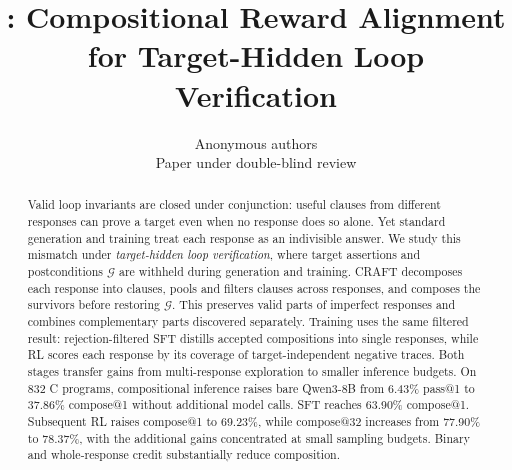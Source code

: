 \documentclass{article}
\title{\sam{}: Compositional Reward Alignment\\
for Target-Hidden Loop Verification}
\author{
  Anonymous authors\\
  Paper under double-blind review
}
\begin{document}
\maketitle

\begin{abstract}
Valid loop invariants are closed under conjunction: useful clauses from
different responses can prove a target even when no response does so alone.
Yet standard generation and training treat each response as an indivisible
answer.  We study this mismatch under \emph{target-hidden loop verification},
where target assertions and postconditions \(\mathcal G\) are withheld during
generation and training.  CRAFT decomposes each response into clauses, pools
and filters clauses across responses, and composes the survivors before
restoring \(\mathcal G\).  This preserves valid parts of imperfect responses
and combines complementary parts discovered separately.  Training uses the
same filtered result: rejection-filtered SFT distills accepted compositions
into single responses, while RL scores each response by its coverage of
target-independent negative traces.  Both stages transfer gains from
multi-response exploration to smaller inference budgets.  On 832 C programs, compositional inference
raises bare Qwen3-8B from 6.43\% pass@1 to 37.86\% compose@1 without additional
model calls.  SFT reaches 63.90\% compose@1.  Subsequent RL raises compose@1
to 69.23\%, while compose@32 increases from 77.90\% to 78.37\%, with the
additional gains concentrated at small sampling budgets.
Binary and whole-response credit substantially reduce composition.
\end{abstract}








\clearpage





\newpage
\appendix

\end{document}
